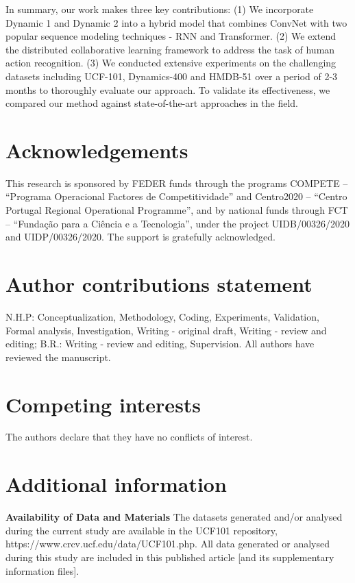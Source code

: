 \documentclass[fleqn,10pt]{wlscirep}
\begin{document}
In summary, our work makes three key contributions: (1) We incorporate Dynamic 1 and Dynamic 2 into a hybrid model that combines ConvNet with two popular sequence modeling techniques - RNN and Transformer. (2) We extend the distributed collaborative learning framework to address the task of human action recognition. (3) We conducted extensive experiments on the challenging datasets including UCF-101, Dynamics-400 and HMDB-51 over a period of 2-3 months to thoroughly evaluate our approach. To validate its effectiveness, we compared our method against state-of-the-art approaches in the field.


\section*{Acknowledgements}
This research is sponsored by FEDER funds through the programs COMPETE – “Programa Operacional Factores de Competitividade” and Centro2020 – “Centro Portugal Regional Operational Programme”, and by national funds through FCT – “Fundação para a Ciência e a Tecnologia”, under the project UIDB/00326/2020 and UIDP/00326/2020. The support is gratefully acknowledged.

\section*{Author contributions statement}
N.H.P: Conceptualization, Methodology, Coding, Experiments, Validation, Formal analysis, Investigation, Writing - original draft, Writing - review and editing; B.R.: Writing - review and editing, Supervision. All authors have reviewed the manuscript.

\section*{Competing interests} The authors declare that they have no conflicts of interest.

\section*{Additional information}
\textbf{Availability of Data and Materials} The datasets generated and/or analysed during the current study are available in the UCF101 repository, https://www.crcv.ucf.edu/data/UCF101.php. All data generated or analysed during this study are included in this published article [and its supplementary information files].
\end{document}
